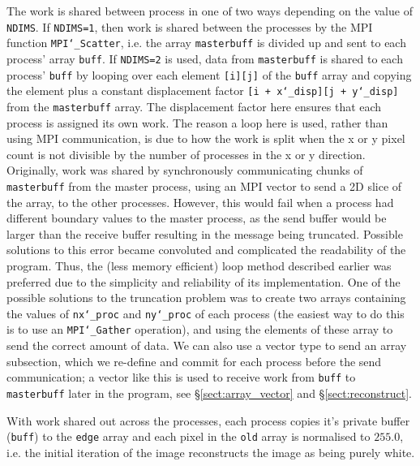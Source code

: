 \documentclass[11pt, a4paper]{article}
\begin{document}
			The work is shared between process in one of two ways depending on the value of \texttt{NDIMS}. If \texttt{NDIMS=1}, then work is shared between the processes by the MPI function \texttt{MPI\char`_Scatter}, i.e. the array \texttt{masterbuff} is divided up and sent to each process' array \texttt{buff}. If \texttt{NDIMS=2} is used, data from \texttt{masterbuff} is shared to each process' \texttt{buff} by looping over each element \texttt{[i][j]} of the \texttt{buff} array and copying the element plus a constant displacement factor \texttt{[i + x\char`_disp][j + y\char`_disp]} from the \texttt{masterbuff} array. The displacement factor here ensures that each process is assigned its own work. The reason a loop here is used, rather than using MPI communication, is due to how the work is split when the x or y pixel count is not divisible by the number of processes in the x or y direction. Originally, work was shared by synchronously communicating chunks of \texttt{masterbuff} from the master process, using an MPI vector to send a 2D slice of the array, to the other processes. However, this would fail when a process had different boundary values to the master process, as the send buffer would be larger than the receive buffer resulting in the message being truncated. Possible solutions to this error became convoluted and complicated the readability of the program. Thus, the (less memory efficient) loop method described earlier was preferred due to the simplicity and reliability of its implementation.	One of the possible solutions to the truncation problem was to create two arrays containing the values of \texttt{nx\char`_proc} and \texttt{ny\char`_proc} of each process (the easiest way to do this is to use an \texttt{MPI\char`_Gather} operation), and using the elements of these array to send the correct amount of data. We can also use a vector type to send an array subsection, which we re-define and commit for each process before the send communication; a vector like this is used to receive work from \texttt{buff} to \texttt{masterbuff} later in the program, see \S\ref{sect:array_vector} and \S\ref{sect:reconstruct}.
			
			With work shared out across the processes, each process copies it's private buffer (\texttt{buff}) to the \texttt{edge} array and each pixel in the \texttt{old} array is normalised to $255.0$, i.e. the initial iteration of the image reconstructs the image as being purely white.
	
\end{document}

